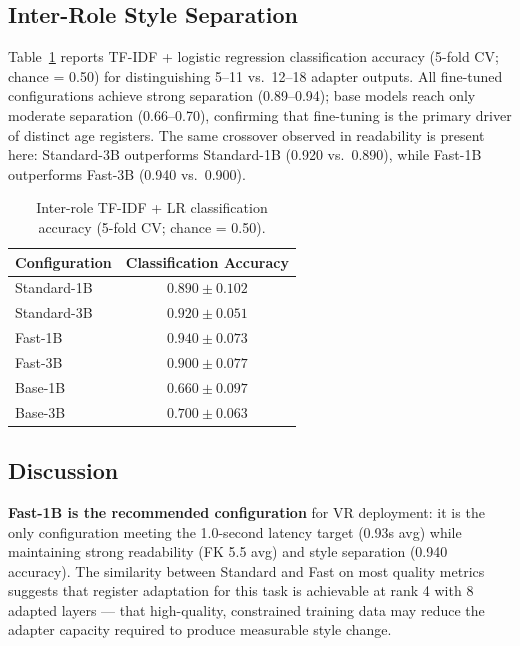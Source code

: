 \documentclass[journal]{IEEEtai}
\begin{document}
\subsection{Inter-Role Style Separation}

Table~\ref{tab:res4} reports TF-IDF + logistic regression classification accuracy (5-fold CV; chance = 0.50) for distinguishing 5--11 vs.\ 12--18 adapter outputs. All fine-tuned configurations achieve strong separation (0.89--0.94); base models reach only moderate separation (0.66--0.70), confirming that fine-tuning is the primary driver of distinct age registers. The same crossover observed in readability is present here: Standard-3B outperforms Standard-1B (0.920 vs.\ 0.890), while Fast-1B outperforms Fast-3B (0.940 vs.\ 0.900).

\begin{table}[!t]
  \centering
  \caption{Inter-role TF-IDF + LR classification accuracy (5-fold CV; chance = 0.50).}
  \label{tab:res4}
  \small
  \begin{tabular}{lc}
    \hline
    Configuration & Classification Accuracy \\
    \hline
    Standard-1B & $0.890 \pm 0.102$ \\
    Standard-3B & $0.920 \pm 0.051$ \\
    Fast-1B     & $0.940 \pm 0.073$ \\
    Fast-3B     & $0.900 \pm 0.077$ \\
    Base-1B     & $0.660 \pm 0.097$ \\
    Base-3B     & $0.700 \pm 0.063$ \\
    \hline
  \end{tabular}
\end{table}


\subsection{Discussion}

\textbf{Fast-1B is the recommended configuration} for VR deployment: it is the only configuration meeting the 1.0-second latency target (0.93s avg) while maintaining strong readability (FK 5.5 avg) and style separation (0.940 accuracy). The similarity between Standard and Fast on most quality metrics suggests that register adaptation for this task is achievable at rank 4 with 8 adapted layers --- that high-quality, constrained training data may reduce the adapter capacity required to produce measurable style change.
\end{document}

